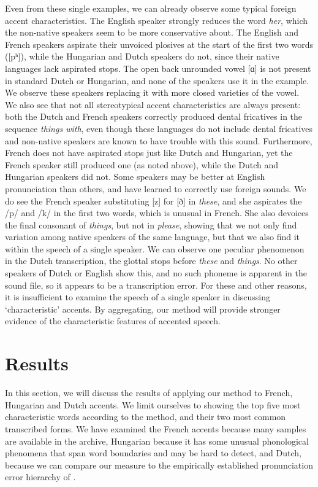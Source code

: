 \documentclass[output=paper]{LSP/langsci}
\begin{document}
Even from these single examples, we can already observe some typical foreign accent characteristics. The English speaker strongly reduces the word \textit{her}, which the non-native speakers seem to be more conservative about. The English and French speakers aspirate their unvoiced plosives at the start of the first two words ([pʰ]), while the Hungarian and Dutch speakers do not, since their native languages lack aspirated stops. The open back unrounded vowel [ɑ] is not present in standard Dutch or Hungarian, and none of the speakers use it in the example. We observe these speakers replacing it with more closed varieties of the vowel. We also see that not all stereotypical accent characteristics are always present: both the Dutch and French speakers correctly produced dental fricatives in the sequence \textit{things with}, even though these languages do not include dental fricatives and non-native speakers are known to have trouble with this sound. Furthermore, French does not have aspirated stops just like Dutch and Hungarian, yet the French speaker still produced one (as noted above), while the Dutch and Hungarian speakers did not. Some speakers may be better at English pronunciation than others, and have learned to correctly use foreign sounds. We do see the French speaker substituting [z] for [ð] in \textit{these}, and she aspirates the /p/ and /k/ in the first two words, which is unusual in French. She also devoices the final consonant of \textit{things}, but not in \textit{please}, showing that we not only find variation among native speakers of the same language, but that we also find it within the speech of a single speaker. We can observe one peculiar phenomenon in the Dutch transcription, the glottal stops before \textit{these} and \textit{things}. No other speakers of Dutch or English show this, and no such phoneme is apparent in the sound file, so it appears to be a transcription error. For these and other reasons, it is insufficient to examine the speech of a single speaker in discussing `characteristic' accents. By aggregating, our method will provide stronger evidence of the characteristic features of accented speech.

\section{Results}
\label{s:results}

In this section, we will discuss the results of applying our method to French, Hungarian and Dutch accents. We limit ourselves to showing the top five most characteristic words according to the method, and their two most common transcribed forms. We have examined the French accents because many samples are available in the archive, Hungarian because it has some unusual phonological phenomena that span word boundaries and may be hard to detect, and Dutch, because we can compare our measure to the empirically established pronunciation error hierarchy of \citet{van_den_doel_evaluation_2006}.
\end{document}
